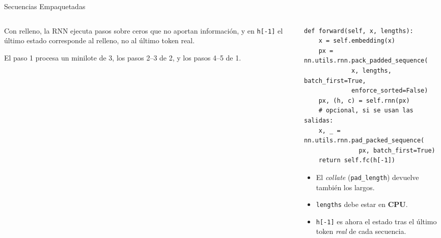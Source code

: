 \documentclass[aspectratio=169, 10pt]{beamer}
\begin{document}
\begin{frame}[fragile]{Secuencias Empaquetadas}

	\begin{columns}[T]
		\begin{column}{0.5\textwidth}
			\small
			Con relleno, la RNN ejecuta pasos sobre ceros que no aportan informaci\'on, y en \texttt{h[-1]} el \'ultimo estado corresponde al relleno, no al \'ultimo token real.

			\vspace{0.2cm}
			\centering

			\raggedright
			\scriptsize
			El paso 1 procesa un minilote de 3, los pasos 2--3 de 2, y los pasos 4--5 de 1.
		\end{column}

		\begin{column}{0.47\textwidth}
			\begin{tcolorbox}[codebox]
\scriptsize
\begin{verbatim}
def forward(self, x, lengths):
    x = self.embedding(x)
    px = nn.utils.rnn.pack_padded_sequence(
             x, lengths, batch_first=True,
             enforce_sorted=False)
    px, (h, c) = self.rnn(px)
    # opcional, si se usan las salidas:
    x, _ = nn.utils.rnn.pad_packed_sequence(
               px, batch_first=True)
    return self.fc(h[-1])
\end{verbatim}
			\end{tcolorbox}

			\begin{itemize}
				\small
				\item El \emph{collate} (\texttt{pad\_length}) devuelve tambi\'en los largos.
				\item \texttt{lengths} debe estar en \textbf{CPU}.
				\item \texttt{h[-1]} es ahora el estado tras el \'ultimo token \emph{real} de cada secuencia.
			\end{itemize}
		\end{column}
	\end{columns}

\end{frame}
\end{document}
